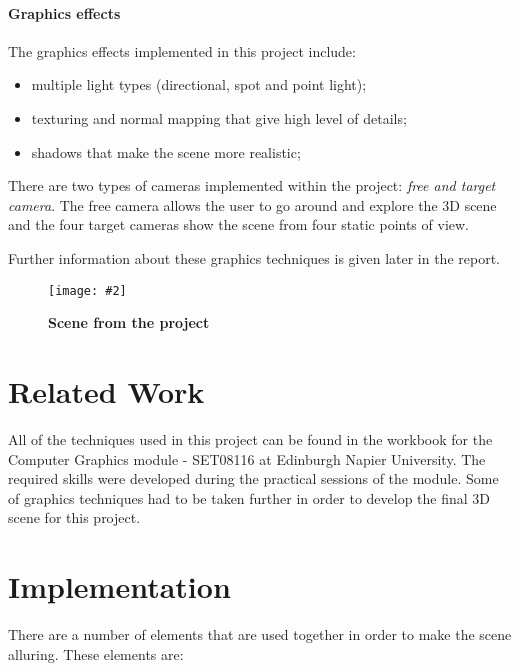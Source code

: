 \documentclass[10pt, a4paper]{article}
\newcommand{\figuremacro}[5]{
    \begin{figure}[#1]
        \centering
        \texttt{[image: \#2]}
        \caption[#3]{\textbf{#3}#4}
        \label{fig:#2}
    \end{figure}
}
\begin{document}
	\paragraph{Graphics effects}The graphics effects implemented in this project include:
	\begin{itemize}
		\item multiple light types (directional, spot and point light);
		\item texturing and normal mapping that give high level of details;
		\item shadows that make the scene more realistic;
	\end{itemize}
    There are two types of cameras implemented within the project: \textit{free and target camera}. The free camera allows the user to go around and explore the 3D scene and the four target cameras show the scene from four static points of view.
    
    Further information about these graphics techniques is given later in the report.
	\figuremacro{h}{general}{Scene from the project}{ }{1.0}
	
	\section{Related Work}

	All of the techniques used in this project can be found in the workbook for the Computer Graphics module - SET08116 at Edinburgh Napier University\cite{book}. The required skills were developed during the practical sessions of the module. Some of graphics techniques had to be taken further in order to develop the final 3D scene for this project.

	\section{Implementation}
		
	There are a number of elements that are used together in order to make the scene alluring. These elements are:
\end{document}
